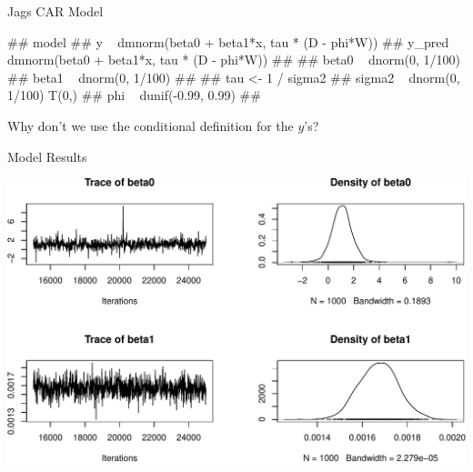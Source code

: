 \documentclass[11pt,ignorenonframetext,]{beamer}
\newenvironment{Shaded}{}{}
\newcommand{\KeywordTok}[1]{\textcolor[rgb]{0.00,0.44,0.13}{\textbf{#1}}}
\newcommand{\StringTok}[1]{\textcolor[rgb]{0.25,0.44,0.63}{#1}}
\newcommand{\OperatorTok}[1]{\textcolor[rgb]{0.40,0.40,0.40}{#1}}
\newcommand{\NormalTok}[1]{#1}
\let\oldShaded\Shaded
\let\endoldShaded\endShaded
\renewenvironment{Shaded}{\footnotesize\begin{spacing}{0.9}\oldShaded}{\endoldShaded\end{spacing}}
\let\oldverbatim\verbatim
\let\endoldverbatim\endverbatim
\renewenvironment{verbatim}{\footnotesize\begin{spacing}{0.9}\oldverbatim}{\endoldverbatim\end{spacing}}
\newcommand{\scriptoutput}{
  \renewenvironment{Shaded}{\scriptsize\begin{spacing}{0.9}\oldShaded}{\endoldShaded\end{spacing}}
  \renewenvironment{verbatim}{\scriptsize\begin{spacing}{0.9}\oldverbatim}{\endoldverbatim\end{spacing}}
}
\begin{document}
\begin{frame}[fragile,t]{Jags CAR Model}

\scriptoutput

\begin{verbatim}
## model{
##   y ~ dmnorm(beta0 + beta1*x, tau * (D - phi*W))
##   y_pred ~ dmnorm(beta0 + beta1*x, tau * (D - phi*W))
##   
##   beta0 ~ dnorm(0, 1/100)
##   beta1 ~ dnorm(0, 1/100)
## 
##   tau <- 1 / sigma2
##   sigma2 ~ dnorm(0, 1/100) T(0,)
##   phi ~ dunif(-0.99, 0.99)
## }
\end{verbatim}

\begin{Shaded}
\end{Shaded}

\pause

Why don't we use the conditional definition for the \(y\)'s?

\end{frame}

\begin{frame}{Model Results}

\includegraphics{Lec19_files/figure-beamer/unnamed-chunk-14-1.pdf}

\end{frame}
\end{document}
